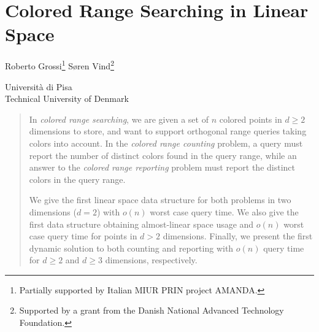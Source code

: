 \chapter{Colored Range Searching in Linear Space}



\begin{infosection}
    \begin{authors}
        Roberto Grossi\footnote{Partially supported by Italian MIUR PRIN project AMANDA.} \qquad S{\o}ren Vind\footnote{Supported by a grant from the Danish National Advanced Technology Foundation.}
    \end{authors}

    \begin{uninames}
         Universit\`{a} di Pisa \\
         Technical University of Denmark
    \end{uninames}

    \begin{abstract}
    In \emph{colored range searching}, we are given a set of $n$ colored points in $d \geq 2$ dimensions to store, and want to support orthogonal range queries taking colors into account. In the \emph{colored range counting} problem, a query must report the number of distinct colors found in the query range, while an answer to the \emph{colored range reporting} problem must report the distinct colors in the query range.
    
    We give the first linear space data structure for both problems in two dimensions ($d=2$) with $o(n)$ worst case query time. We also give the first data structure obtaining almost-linear space usage and $o(n)$ worst case query time for points in $d > 2$ dimensions. Finally, we present the first dynamic solution to both counting and reporting with $o(n)$ query time for $d \geq 2$ and $d \geq 3$ dimensions, respectively.
    \end{abstract}
\end{infosection}

